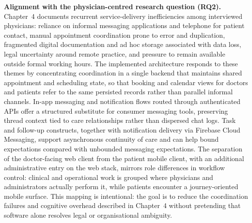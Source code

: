 \documentclass[11pt,a4paper,twoside,openany,headings=normal]{scrreprt}
\begin{document}
\textbf{Alignment with the physician-centred research question (RQ2).} Chapter~4 documents recurrent service-delivery inefficiencies among interviewed physicians: reliance on informal messaging applications and telephone for patient contact, manual appointment coordination prone to error and duplication, fragmented digital documentation and ad hoc storage associated with data loss, legal uncertainty around remote practice, and pressure to remain available outside formal working hours. The implemented architecture responds to these themes by concentrating coordination in a single backend that maintains shared appointment and scheduling state, so that booking and calendar views for doctors and patients refer to the same persisted records rather than parallel informal channels. In-app messaging and notification flows routed through authenticated APIs offer a structured substitute for consumer messaging tools, preserving thread context tied to care relationships rather than dispersed chat logs. Task and follow-up constructs, together with notification delivery via Firebase Cloud Messaging, support asynchronous continuity of care and can help bound expectations compared with unbounded messaging expectations. The separation of the doctor-facing web client from the patient mobile client, with an additional administrative entry on the web stack, mirrors role differences in workflow control: clinical and operational work is grouped where physicians and administrators actually perform it, while patients encounter a journey-oriented mobile surface. This mapping is intentional: the goal is to reduce the coordination failures and cognitive overhead described in Chapter~4 without pretending that software alone resolves legal or organisational ambiguity.
\end{document}
